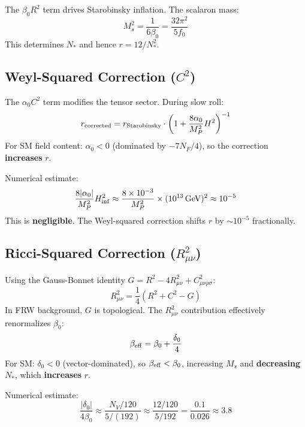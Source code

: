 \documentclass[11pt,a4paper]{article}
\begin{document}
The $\beta_0 R^2$ term drives Starobinsky inflation. The scalaron mass:
\begin{equation}
M_s^2 = \frac{1}{6\beta_0} = \frac{32\pi^2}{5 f_0}
\end{equation}
This determines $N_*$ and hence $r = 12/N_*^2$.

\subsection{Weyl-Squared Correction ($C^2$)}

The $\alpha_0 C^2$ term modifies the tensor sector. During slow roll:
\begin{equation}
r_{\rm corrected} = r_{\rm Starobinsky} \cdot \left(1 + \frac{8\alpha_0}{M_P^2} H^2\right)^{-1}
\end{equation}
For SM field content: $\alpha_0 < 0$ (dominated by $-7N_F/4$), so the correction \textbf{increases} $r$.

Numerical estimate:
\begin{equation}
\frac{8|\alpha_0|}{M_P^2} H_{\rm inf}^2 \approx \frac{8 \times 10^{-3}}{M_P^2} \times (10^{13}\,\text{GeV})^2 \approx 10^{-5}
\end{equation}
This is \textbf{negligible}. The Weyl-squared correction shifts $r$ by $\sim 10^{-5}$ fractionally.

\subsection{Ricci-Squared Correction ($R_{\mu\nu}^2$)}

Using the Gauss-Bonnet identity $G = R^2 - 4R_{\mu\nu}^2 + C_{\mu\nu\rho\sigma}^2$:
\begin{equation}
R_{\mu\nu}^2 = \frac{1}{4}(R^2 + C^2 - G)
\end{equation}
In FRW background, $G$ is topological. The $R_{\mu\nu}^2$ contribution effectively renormalizes $\beta_0$:
\begin{equation}
\beta_{\rm eff} = \beta_0 + \frac{\delta_0}{4}
\end{equation}
For SM: $\delta_0 < 0$ (vector-dominated), so $\beta_{\rm eff} < \beta_0$, increasing $M_s$ and \textbf{decreasing} $N_*$, which \textbf{increases} $r$.

Numerical estimate:
\begin{equation}
\frac{|\delta_0|}{4\beta_0} \approx \frac{N_V / 120}{5/(192)} \approx \frac{12/120}{5/192} = \frac{0.1}{0.026} \approx 3.8
\end{equation}
\end{document}
